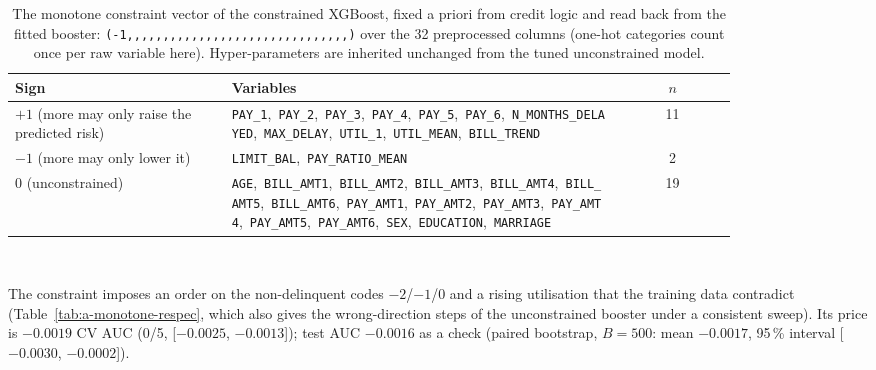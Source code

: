 \begin{table}[!htbp]
  \caption{The monotone constraint vector of the constrained XGBoost, fixed a priori from credit logic and read back from the fitted booster: \texttt{(-1,,,,,,,,,,,,,,,,,,,,,,,,,,,,,,,)} over the 32 preprocessed columns (one-hot categories count once per raw variable here). Hyper-parameters are inherited unchanged from the tuned unconstrained model.}
  \label{tab:a-monotone}
  \centering
  \small
  \begin{tabular}{@{}L{0.30\linewidth}L{0.54\linewidth}c@{}}
    \toprule
    Sign & Variables & $n$ \\
    \midrule
    $+1$ (more may only raise the predicted risk) & \texttt{PAY\_\allowbreak{}1},\allowbreak\ \texttt{PAY\_\allowbreak{}2},\allowbreak\ \texttt{PAY\_\allowbreak{}3},\allowbreak\ \texttt{PAY\_\allowbreak{}4},\allowbreak\ \texttt{PAY\_\allowbreak{}5},\allowbreak\ \texttt{PAY\_\allowbreak{}6},\allowbreak\ \texttt{N\_\allowbreak{}MONTHS\_\allowbreak{}DELAYED},\allowbreak\ \texttt{MAX\_\allowbreak{}DELAY},\allowbreak\ \texttt{UTIL\_\allowbreak{}1},\allowbreak\ \texttt{UTIL\_\allowbreak{}MEAN},\allowbreak\ \texttt{BILL\_\allowbreak{}TREND} & 11 \\
    $-1$ (more may only lower it) & \texttt{LIMIT\_\allowbreak{}BAL},\allowbreak\ \texttt{PAY\_\allowbreak{}RATIO\_\allowbreak{}MEAN} & 2 \\
    $0$ (unconstrained) & \texttt{AGE},\allowbreak\ \texttt{BILL\_\allowbreak{}AMT1},\allowbreak\ \texttt{BILL\_\allowbreak{}AMT2},\allowbreak\ \texttt{BILL\_\allowbreak{}AMT3},\allowbreak\ \texttt{BILL\_\allowbreak{}AMT4},\allowbreak\ \texttt{BILL\_\allowbreak{}AMT5},\allowbreak\ \texttt{BILL\_\allowbreak{}AMT6},\allowbreak\ \texttt{PAY\_\allowbreak{}AMT1},\allowbreak\ \texttt{PAY\_\allowbreak{}AMT2},\allowbreak\ \texttt{PAY\_\allowbreak{}AMT3},\allowbreak\ \texttt{PAY\_\allowbreak{}AMT4},\allowbreak\ \texttt{PAY\_\allowbreak{}AMT5},\allowbreak\ \texttt{PAY\_\allowbreak{}AMT6},\allowbreak\ \texttt{SEX},\allowbreak\ \texttt{EDUCATION},\allowbreak\ \texttt{MARRIAGE} & 19 \\
    \bottomrule
  \end{tabular}
  \\[3pt]\begin{minipage}{\linewidth}\footnotesize The constraint imposes an order on the non-delinquent codes $-2$/$-1$/$0$ and a rising utilisation that the training data contradict (Table~\ref{tab:a-monotone-respec}, which also gives the wrong-direction steps of the unconstrained booster under a consistent sweep). Its price is $-0.0019$ CV AUC (0/5, [$-0.0025$, $-0.0013$]); test AUC $-0.0016$ as a check (paired bootstrap, $B=500$: mean $-0.0017$, 95\,\% interval [$-0.0030$, $-0.0002$]).\end{minipage}
\end{table}


